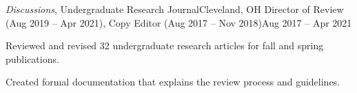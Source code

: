 \begin{ritemize}
{\textit{Discussions}, Undergraduate Research Journal}{Cleveland, OH}
{Director of Review (Aug 2019 -- Apr 2021), Copy Editor (Aug 2017 -- Nov 2018)}{Aug 2017 -- Apr 2021}
	\item Reviewed and revised 32 undergraduate research articles for fall and spring publications.
	\item Created formal documentation that explains the review process and guidelines.
\end{ritemize}